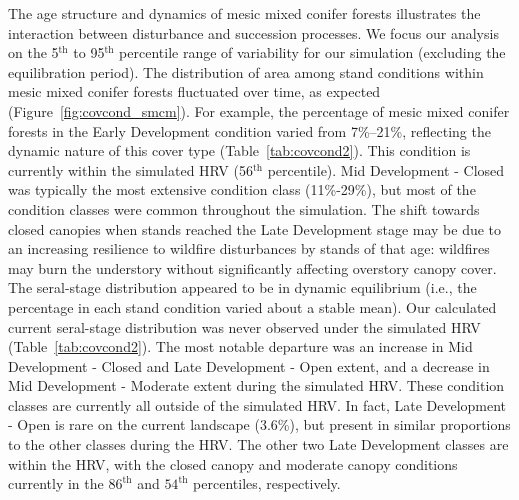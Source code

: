 The age structure and dynamics of mesic mixed conifer forests illustrates the interaction between disturbance and succession processes. We focus our analysis on the 5$^{\text{th}}$ to 95$^{\text{th}}$ percentile range of variability for our simulation (excluding the equilibration period). %
%
The distribution of area among stand conditions within mesic mixed conifer forests fluctuated over time, as expected (Figure~\ref{fig:covcond_smcm}). For example, the percentage of mesic mixed conifer forests in the Early Development condition varied from 7\%--21\%, reflecting the dynamic nature of this cover type (Table~\ref{tab:covcond2}). This condition is currently within the simulated HRV (56$^{\text{th}}$ percentile). Mid Development - Closed was typically the most extensive condition class (11\%-29\%), but most of the condition classes were common throughout the simulation. The shift towards closed canopies when stands reached the Late Development stage may be due to an increasing resilience to wildfire disturbances by stands of that age: wildfires may burn the understory without significantly affecting overstory canopy cover. %
%
The seral-stage distribution appeared to be in dynamic equilibrium (i.e., the percentage in each stand condition varied about a stable mean). Our calculated current seral-stage distribution was never observed under the simulated HRV (Table~\ref{tab:covcond2}). The most notable departure was an increase in Mid Development - Closed and Late Development - Open extent, and a decrease in Mid Development - Moderate extent during the simulated HRV. These condition classes are currently all outside of the simulated HRV. In fact, Late Development - Open is rare on the current landscape (3.6\%), but present in similar proportions to the other classes during the HRV. The other two Late Development classes are within the HRV, with the closed canopy and moderate canopy conditions currently in the $86^{\text{th}}$ and $54^{\text{th}}$ percentiles, respectively. 

